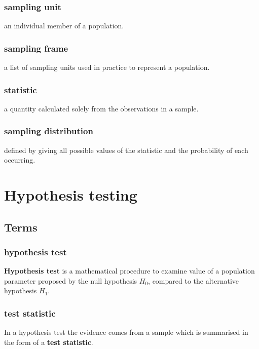 \documentclass[a4paper,9pt]{scrartcl}
\begin{document}
    \subsubsection{sampling unit}

    an individual member of a population.

    \subsubsection{sampling frame}
    a list of sampling units used in practice to represent a population.

    \subsubsection{statistic}

    a quantity calculated solely from the observations in a sample.

    \subsubsection{sampling distribution}

    defined by giving all possible values of the statistic and the probability of each occurring.


    \section{Hypothesis testing}

    \subsection{Terms}

    \subsubsection{hypothesis test}

    \textbf{Hypothesis test} is a mathematical procedure to examine value of a population parameter proposed by the null hypothesis $H_0$, compared to the alternative hypothesis $H_1$.

    \subsubsection{test statistic}

    In a hypothesis test the evidence comes from a sample which is summarised in the form of a \textbf{test statistic}.
\end{document}
